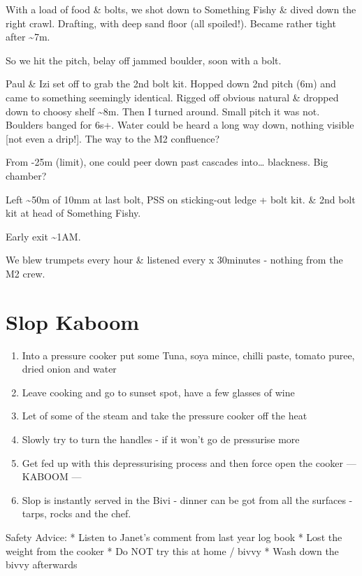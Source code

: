 With a load of food \& bolts, we shot down to Something Fishy \& dived
down the right crawl. Drafting, with deep sand floor (all spoiled!).
Became rather tight after \textasciitilde{}7m.

So we hit the pitch, belay off jammed boulder, soon with a bolt.

Paul \& Izi set off to grab the 2nd bolt kit. Hopped down 2nd pitch (6m)
and came to something seemingly identical. Rigged off obvious natural \&
dropped down to choosy shelf \textasciitilde{}8m. Then I turned around.
Small pitch it was not. Boulders banged for 6s+. Water could be heard a
long way down, nothing visible {[}not even a drip!{]}. The way to the M2
confluence?

From -25m (limit), one could peer down past cascades into\ldots{}
blackness. Big chamber?

Left \textasciitilde{}50m of 10mm at last bolt, PSS on sticking-out
ledge + bolt kit. \& 2nd bolt kit at head of Something Fishy.

Early exit \textasciitilde{}1AM.

We blew trumpets every hour \& listened every x 30minutes - nothing from
the M2 crew.


\section{Slop Kaboom}\label{slop-kaboom}

\begin{enumerate}
\def\labelenumi{\arabic{enumi})}
\tightlist
\item
  Into a pressure cooker put some Tuna, soya mince, chilli paste, tomato
  puree, dried onion and water
\item
  Leave cooking and go to sunset spot, have a few glasses of wine
\item
  Let of some of the steam and take the pressure cooker off the heat
\item
  Slowly try to turn the handles - if it won't go de pressurise more
\item
  Get fed up with this depressurising process and then force open the
  cooker --- KABOOM ---
\item
  Slop is instantly served in the Bivi - dinner can be got from all the
  surfaces - tarps, rocks and the chef.
\end{enumerate}

Safety Advice: * Listen to Janet's comment from last year log book *
Lost the weight from the cooker * Do NOT try this at home / bivvy * Wash
down the bivvy afterwards

